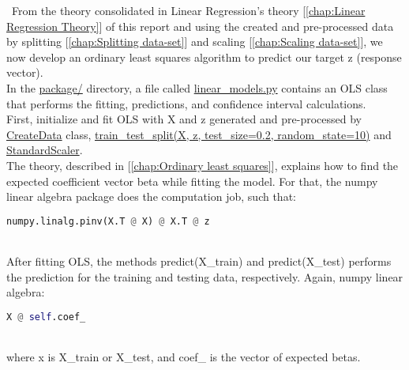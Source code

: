 \quad \, From the theory consolidated in Linear Regression's theory [\ref{chap:Linear Regression Theory}] of this report and using the created and pre-processed data by splitting [\ref{chap:Splitting data-set}] and scaling [\ref{chap:Scaling data-set}], we now develop an ordinary least squares algorithm to predict our target z (response vector).\\

In the \href{https://github.com/fabiorodp/UiO-FYS-STK4155/tree/master/Project1/package}{package/} directory, a file called \href{https://github.com/fabiorodp/UiO-FYS-STK4155/tree/master/Project1/package/linear_models.py}{linear\_models.py} contains an OLS class that performs the fitting, predictions, and confidence interval calculations.\\

First, initialize and fit OLS with X and z generated and pre-processed by \href{https://github.com/fabiorodp/UiO-FYS-STK4155/blob/master/Project1/package/Create_data.py}{CreateData} class, \href{https://scikit-learn.org/stable/modules/generated/sklearn.model_selection.train_test_split.html}{train\_test\_split(X, z, test\_size=0.2, random\_state=10)} and \href{https://scikit-learn.org/stable/modules/generated/sklearn.preprocessing.StandardScaler.html}{StandardScaler}.\\

The theory, described in [\ref{chap:Ordinary least squares}], explains how to find the expected coefficient vector beta while fitting the model. For that, the numpy linear algebra package does the computation job, such that:\\

\begin{lstlisting}[language=Python]
                numpy.linalg.pinv(X.T @ X) @ X.T @ z
\end{lstlisting}\\

After fitting OLS, the methods predict(X\_train) and predict(X\_test) performs the prediction for the training and testing data, respectively. Again, numpy linear algebra:\\

\begin{lstlisting}[language=Python]
                        X @ self.coef_
\end{lstlisting}\\

where x is X\_train or X\_test, and coef\_ is the vector of expected betas.\\

